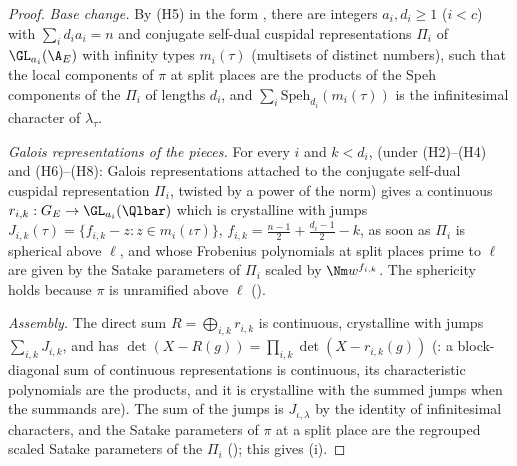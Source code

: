 \begin{proof}
\emph{Base change.} By (H5) in the form , there are integers
$a_i,d_i\ge1$ ($i<c$) with $\sum_id_ia_i=n$ and conjugate self-dual cuspidal representations $\Pi_i$ of $\GL_{a_i}(\A_E)$ with infinity
types $m_i(\tau)$ (multisets of distinct numbers), such that the local components of $\pi$ at split places are the products of the
Speh components of the $\Pi_i$ of lengths $d_i$, and $\sum_i\mathrm{Speh}_{d_i}(m_i(\tau))$ is the infinitesimal character of $\lambda_\tau$.

\emph{Galois representations of the pieces.} For every $i$ and $k<d_i$, 
(under (H2)--(H4) and (H6)--(H8): Galois representations attached to the conjugate self-dual cuspidal representation $\Pi_i$,
twisted by a power of the norm) gives a continuous $r_{i,k}:G_E\to\GL_{a_i}(\Qlbar)$
which is crystalline with jumps $J_{i,k}(\tau)=\{f_{i,k}-z:z\in m_i(\iota\tau)\}$, $f_{i,k}=\tfrac{n-1}2+\tfrac{d_i-1}2-k$, as soon as
$\Pi_i$ is spherical above $\ell$, and whose Frobenius polynomials at split places prime to $\ell$ are given by the Satake parameters
of $\Pi_i$ scaled by $\Nm w^{f_{i,k}}$. The sphericity holds because $\pi$ is unramified above $\ell$
().

\emph{Assembly.} The direct sum $R=\bigoplus_{i,k}r_{i,k}$ is continuous, crystalline with jumps $\sum_{i,k}J_{i,k}$, and has
$\det(X-R(g))=\prod_{i,k}\det(X-r_{i,k}(g))$ (: a block-diagonal sum of continuous
representations is continuous, its characteristic polynomials are the products, and it is crystalline with the summed jumps when the
summands are). The sum of the jumps is $J_{\iota,\lambda}$ by the identity of infinitesimal characters, and the Satake
parameters of $\pi$ at a split place are the regrouped scaled Satake parameters of the $\Pi_i$
(); this gives (i).


\end{proof}
